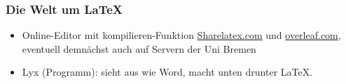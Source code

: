 \begin{frame}
\frametitle{Die Welt um \LaTeX}
\begin{itemize}
\item Online-Editor mit kompilieren-Funktion \url{Sharelatex.com} und \url{overleaf.com}, eventuell demnächst auch auf Servern der Uni Bremen
\item Lyx (Programm): sieht aus wie Word, macht unten drunter \LaTeX.
\end{itemize}
\end{frame}
